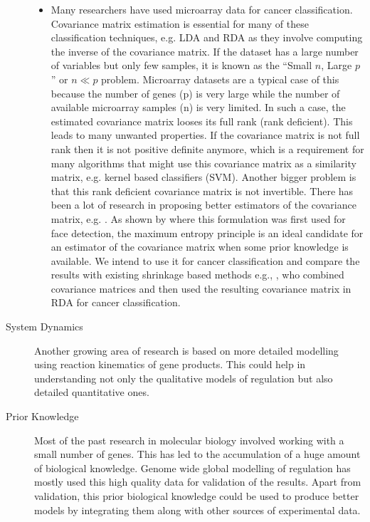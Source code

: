 \begin{description}
\begin{itemize}
    \item Many researchers have used microarray data for cancer classification. Covariance matrix estimation is essential for many of these classification techniques, e.g. \ac{LDA} and \ac{RDA} as they involve computing the inverse of the covariance matrix. If the dataset has a large number of variables but only few samples, it is known as the ``Small $n$, Large $p$'' or $n\ll p$ problem. Microarray datasets are a typical case of this because the number of genes (p) is very large while the number of available microarray samples (n) is very limited. In such a case, the estimated covariance matrix looses its full rank (rank deficient). This leads to many unwanted properties. If the covariance matrix is not full rank then it is not positive definite anymore, which is a requirement for many algorithms that might use this covariance matrix as a similarity matrix, e.g. kernel based classifiers (SVM). Another bigger problem is that this rank deficient covariance matrix is not 
invertible. There has been a lot of research in proposing better estimators of the covariance matrix, e.g. \citet{schaefer05shrinkage}. As shown by \citet{carlos05maximum} where this formulation was first used for face detection, the maximum entropy principle is an ideal candidate for an estimator of the covariance matrix when some prior knowledge is available. We intend to use it for cancer classification and compare the results with existing shrinkage based methods e.g., \citet{Tai2008Incorporating}, who combined covariance matrices and then used the resulting covariance matrix in \ac{RDA} for cancer classification.  
\end{itemize}

\item[System Dynamics] Another growing area of research is based on more detailed modelling using reaction kinematics of gene products. This could help in understanding not only the qualitative models of regulation but also detailed quantitative ones. 

\item[Prior Knowledge] Most of the past research in molecular biology involved working with a small number of genes. This has led to the accumulation of a huge amount of biological knowledge. Genome wide global modelling of regulation has mostly used this high quality data for validation of the results. Apart from validation, this prior biological knowledge could be used to produce better models by integrating them along with other sources of experimental data.


\end{description}
